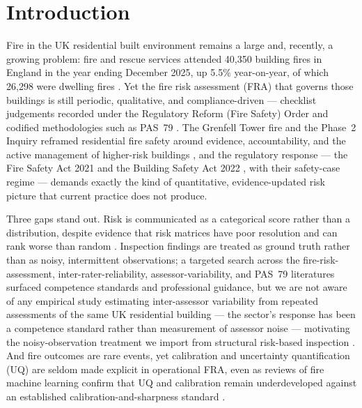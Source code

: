 \section{Introduction}
\label{sec:intro}

Fire in the UK residential built environment remains a large and, recently, a
growing problem: fire and rescue services attended 40{,}350 building fires in
England in the year ending December 2025, up 5.5\% year-on-year, of which 26{,}298
were dwelling fires \citep{mhclg2026firestats}. Yet the fire risk assessment (FRA)
that governs those buildings is still periodic, qualitative, and compliance-driven
--- checklist judgements recorded under the Regulatory Reform (Fire Safety)
Order \citep{rrfso2005} and codified methodologies such as PAS~79
\citep{pas79_1_2020,pas79_2_2020}. The Grenfell Tower fire and the Phase~2 Inquiry
reframed residential fire safety around evidence, accountability, and the active
management of higher-risk buildings \citep{grenfell2024phase2}, and the regulatory
response --- the Fire Safety Act 2021 \citep{firesafetyact2021} and the Building
Safety Act 2022 \citep{bsa2022}, with their safety-case regime --- demands exactly
the kind of quantitative, evidence-updated risk picture that current practice does
not produce.

Three gaps stand out. Risk is communicated as a categorical score rather than a
distribution, despite evidence that risk matrices have poor resolution and can rank
worse than random \citep{cox2008,thomas2014}. Inspection findings are treated as
ground truth rather than as noisy, intermittent observations; a targeted search
across the fire-risk-assessment, inter-rater-reliability, assessor-variability, and
PAS~79 literatures surfaced competence standards and professional guidance, but we
are not aware of any empirical study estimating inter-assessor variability from
repeated assessments of the same UK residential building --- the sector's response
has been a competence standard \citep{bs8674_2025} rather than measurement
of assessor noise --- motivating the noisy-observation treatment we import from
structural risk-based inspection \citep{straub2005,luque2019}. And fire outcomes are
rare events, yet calibration and uncertainty quantification (UQ) are seldom made
explicit in operational FRA, even as reviews of fire machine learning confirm that
UQ and calibration remain underdeveloped \citep{tapehnaser2022} against an established
calibration-and-sharpness standard \citep{gneiting2007}.

